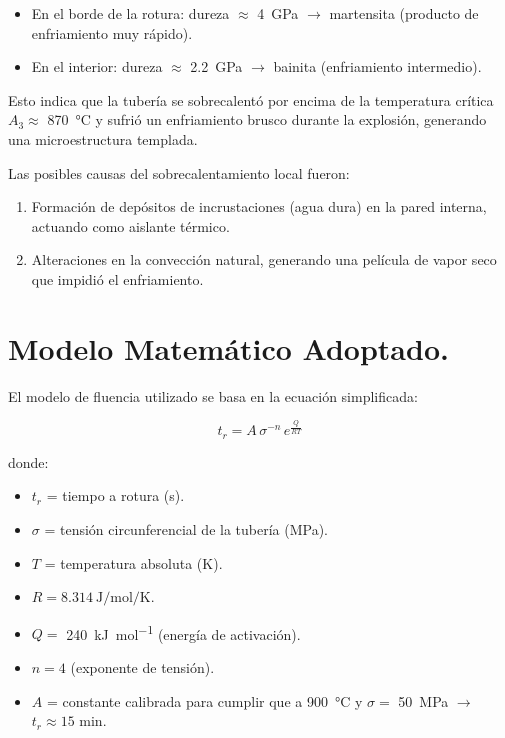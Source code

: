 \documentclass[12pt,a4paper]{article}
\begin{document}
\begin{itemize}
    \item En el borde de la rotura: dureza $\approx$ \SI{4}{\giga\pascal} $\rightarrow$ martensita (producto de enfriamiento muy rápido).
    \item En el interior: dureza $\approx$ \SI{2,2}{\giga\pascal} $\rightarrow$ bainita (enfriamiento intermedio).
\end{itemize}

Esto indica que la tubería se sobrecalentó por encima de la temperatura crítica $A_3 \approx$ \SI{870}{\celsius} y sufrió un enfriamiento brusco durante la explosión, generando una microestructura templada.

Las posibles causas del sobrecalentamiento local fueron:

\begin{enumerate}
    \item Formación de depósitos de incrustaciones (agua dura) en la pared interna, actuando como aislante térmico.
    \item Alteraciones en la convección natural, generando una película de vapor seco que impidió el enfriamiento.
\end{enumerate}

\section{Modelo Matemático Adoptado.}

El modelo de fluencia utilizado se basa en la ecuación simplificada:

\begin{equation}
    t_r = A \, \sigma^{-n} \, e^{\frac{Q}{R T}}
\end{equation}

donde:

\begin{itemize}
    \item $t_r$ = tiempo a rotura (\si{\second}).
    \item $\sigma$ = tensión circunferencial de la tubería (\si{\mega\pascal}).
    \item $T$ = temperatura absoluta (\si{\kelvin}).
    \item \(R = \SI[per-mode=symbol]{8,314}{\joule\per\mole\per\kelvin}\).
    \item $Q =$ \SI[per-mode=symbol]{240}{\kilo\joule\per\mole} (energía de activación).
    \item $n = 4$ (exponente de tensión).
    \item $A$ = constante calibrada para cumplir que a \SI{900}{\celsius} y $\sigma=$ \SI{50}{\mega\pascal} $\rightarrow$ $t_r \approx 15$ min.
\end{itemize}
\end{document}
